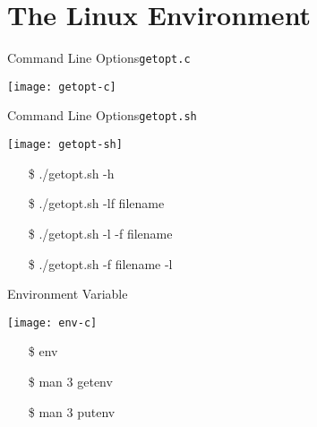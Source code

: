 


\section{The Linux Environment}
\label{sec:linux-environment}

\begin{frame}{Command Line Options}{\texttt{getopt.c}}
  \begin{center}
    \texttt{[image: getopt-c]}
  \end{center}
  \qquad\qquad{}
\end{frame}

\begin{frame}{Command Line Options}{\texttt{getopt.sh}}
  \begin{center}
    \texttt{[image: getopt-sh]}    
  \end{center}
  \ttfamily
  \begin{itemize}
  \item[\$] ./getopt.sh -h
  \item[\$] ./getopt.sh -lf filename
  \item[\$] ./getopt.sh -l -f filename
  \item[\$] ./getopt.sh -f filename -l
  \end{itemize}
\end{frame}

\begin{frame}{Environment Variable}
  \begin{minipage}{.5\linewidth}
    \texttt{[image: env-c]}
  \end{minipage}\quad
  \begin{minipage}{.45\linewidth}
  \ttfamily
  \begin{itemize}
  \item[\$] env
  \item[\$] man 3 getenv
  \item[\$] man 3 putenv
  \end{itemize}  
  \end{minipage}
\end{frame}

